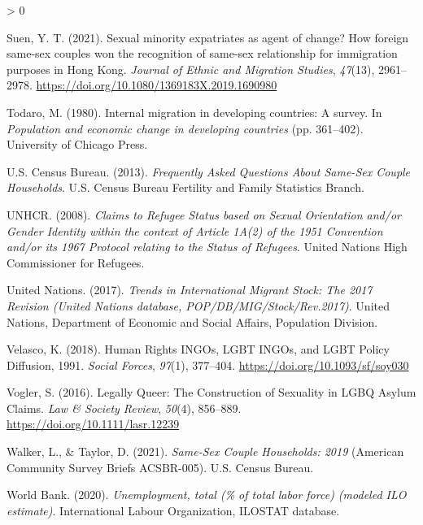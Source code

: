 \documentclass[
  12pt,
]{article}
\newlength{\cslhangindent}
\newenvironment{CSLReferences}[2] %
 {%
  \setlength{\parindent}{0pt}
  \ifodd #1 \everypar{\setlength{\hangindent}{\cslhangindent}}\ignorespaces\fi
  \ifnum #2 > 0
  \setlength{\parskip}{#2\baselineskip}
  \fi
 }%
 {}
\begin{document}
\begin{CSLReferences}{1}{0}
\leavevmode\hypertarget{ref-suen_2021_sexual}{}%
Suen, Y. T. (2021). Sexual minority expatriates as agent of change? How foreign same-sex couples won the recognition of same-sex relationship for immigration purposes in {Hong Kong}. \emph{Journal of Ethnic and Migration Studies}, \emph{47}(13), 2961--2978. \url{https://doi.org/10.1080/1369183X.2019.1690980}

\leavevmode\hypertarget{ref-todaro_1980}{}%
Todaro, M. (1980). Internal migration in developing countries: A survey. In \emph{Population and economic change in developing countries} (pp. 361--402). {University of Chicago Press}.

\leavevmode\hypertarget{ref-u.s.censusbureau_2013}{}%
U.S. Census Bureau. (2013). \emph{Frequently {Asked Questions About Same}-{Sex Couple Households}}. {U.S. Census Bureau Fertility and Family Statistics Branch}.

\leavevmode\hypertarget{ref-unhcr_2008}{}%
UNHCR. (2008). \emph{Claims to {Refugee Status} based on {Sexual Orientation} and/or {Gender Identity} within the context of {Article 1A}(2) of the 1951 {Convention} and/or its 1967 {Protocol} relating to the {Status} of {Refugees}}. {United Nations High Commissioner for Refugees}.

\leavevmode\hypertarget{ref-unitednations_2017}{}%
United Nations. (2017). \emph{Trends in {International Migrant Stock}: The 2017 {Revision} ({United Nations} database, {POP}/{DB}/{MIG}/{Stock}/{Rev}.2017)}. {United Nations, Department of Economic and Social Affairs, Population Division}.

\leavevmode\hypertarget{ref-velasco_2018}{}%
Velasco, K. (2018). Human {Rights INGOs}, {LGBT INGOs}, and {LGBT Policy Diffusion}, 1991{}. \emph{Social Forces}, \emph{97}(1), 377--404. \url{https://doi.org/10.1093/sf/soy030}

\leavevmode\hypertarget{ref-vogler_2016}{}%
Vogler, S. (2016). Legally {Queer}: The {Construction} of {Sexuality} in {LGBQ Asylum Claims}. \emph{Law \& Society Review}, \emph{50}(4), 856--889. \url{https://doi.org/10.1111/lasr.12239}

\leavevmode\hypertarget{ref-walker_2021}{}%
Walker, L., \& Taylor, D. (2021). \emph{Same-{Sex Couple Households}: 2019} (American Community Survey Briefs ACSBR-005). {U.S. Census Bureau}.

\leavevmode\hypertarget{ref-worldbank_2020}{}%
World Bank. (2020). \emph{Unemployment, total (\% of total labor force) (modeled {ILO} estimate)}. {International Labour Organization, ILOSTAT database.}

\end{CSLReferences}
\end{document}
